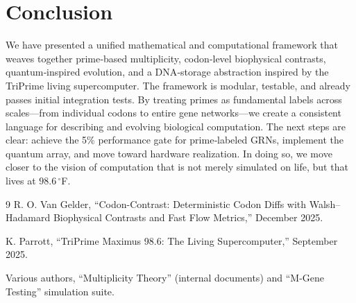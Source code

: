 \documentclass[12pt]{article}
\begin{document}
\section{Conclusion}
\label{sec:conclusion}

We have presented a unified mathematical and computational framework that weaves together prime‑based multiplicity, codon‑level biophysical contrasts, quantum‑inspired evolution, and a DNA‑storage abstraction inspired by the TriPrime living supercomputer. The framework is modular, testable, and already passes initial integration tests. By treating primes as fundamental labels across scales—from individual codons to entire gene networks—we create a consistent language for describing and evolving biological computation. The next steps are clear: achieve the 5\% performance gate for prime‑labeled GRNs, implement the quantum array, and move toward hardware realization. In doing so, we move closer to the vision of computation that is not merely simulated on life, but that lives at $98.6\,^\circ$F.

\begin{thebibliography}{9}
R. O. Van Gelder, ``Codon-Contrast: Deterministic Codon Diffs with Walsh–Hadamard Biophysical Contrasts and Fast Flow Metrics,'' December 2025.

K. Parrott, ``TriPrime Maximus 98.6: The Living Supercomputer,'' September 2025.

Various authors, ``Multiplicity Theory'' (internal documents) and ``M-Gene Testing'' simulation suite.
\end{thebibliography}
\end{document}

